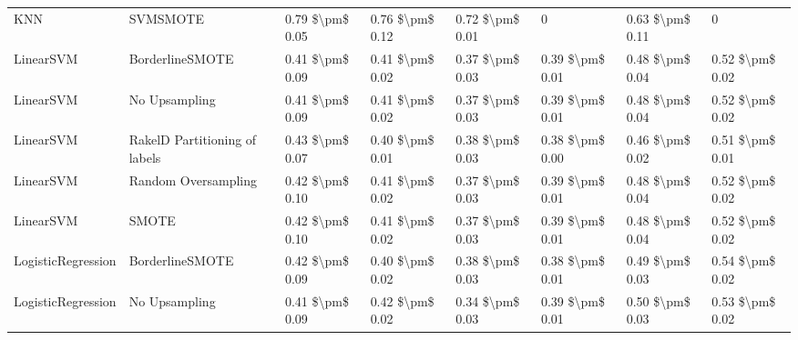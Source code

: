 \begin{tabular}{llllllll}
                            KNN &                      SVMSMOTE & 0.79 \$\textbackslash pm\$ 0.05 &           0.76 \$\textbackslash pm\$ 0.12 &       0.72 \$\textbackslash pm\$ 0.01 &                      0 &                         0.63 \$\textbackslash pm\$ 0.11 &               0 \\
                      LinearSVM &               BorderlineSMOTE & 0.41 \$\textbackslash pm\$ 0.09 &           0.41 \$\textbackslash pm\$ 0.02 &       0.37 \$\textbackslash pm\$ 0.03 &        0.39 \$\textbackslash pm\$ 0.01 &                         0.48 \$\textbackslash pm\$ 0.04 & 0.52 \$\textbackslash pm\$ 0.02 \\
                      LinearSVM &                 No Upsampling & 0.41 \$\textbackslash pm\$ 0.09 &           0.41 \$\textbackslash pm\$ 0.02 &       0.37 \$\textbackslash pm\$ 0.03 &        0.39 \$\textbackslash pm\$ 0.01 &                         0.48 \$\textbackslash pm\$ 0.04 & 0.52 \$\textbackslash pm\$ 0.02 \\
                      LinearSVM & RakelD Partitioning of labels & 0.43 \$\textbackslash pm\$ 0.07 &           0.40 \$\textbackslash pm\$ 0.01 &       0.38 \$\textbackslash pm\$ 0.03 &        0.38 \$\textbackslash pm\$ 0.00 &                         0.46 \$\textbackslash pm\$ 0.02 & 0.51 \$\textbackslash pm\$ 0.01 \\
                      LinearSVM &           Random Oversampling & 0.42 \$\textbackslash pm\$ 0.10 &           0.41 \$\textbackslash pm\$ 0.02 &       0.37 \$\textbackslash pm\$ 0.03 &        0.39 \$\textbackslash pm\$ 0.01 &                         0.48 \$\textbackslash pm\$ 0.04 & 0.52 \$\textbackslash pm\$ 0.02 \\
                      LinearSVM &                         SMOTE & 0.42 \$\textbackslash pm\$ 0.10 &           0.41 \$\textbackslash pm\$ 0.02 &       0.37 \$\textbackslash pm\$ 0.03 &        0.39 \$\textbackslash pm\$ 0.01 &                         0.48 \$\textbackslash pm\$ 0.04 & 0.52 \$\textbackslash pm\$ 0.02 \\
             LogisticRegression &               BorderlineSMOTE & 0.42 \$\textbackslash pm\$ 0.09 &           0.40 \$\textbackslash pm\$ 0.02 &       0.38 \$\textbackslash pm\$ 0.03 &        0.38 \$\textbackslash pm\$ 0.01 &                         0.49 \$\textbackslash pm\$ 0.03 & 0.54 \$\textbackslash pm\$ 0.02 \\
             LogisticRegression &                 No Upsampling & 0.41 \$\textbackslash pm\$ 0.09 &           0.42 \$\textbackslash pm\$ 0.02 &       0.34 \$\textbackslash pm\$ 0.03 &        0.39 \$\textbackslash pm\$ 0.01 &                         0.50 \$\textbackslash pm\$ 0.03 & 0.53 \$\textbackslash pm\$ 0.02 \\

\end{tabular}
